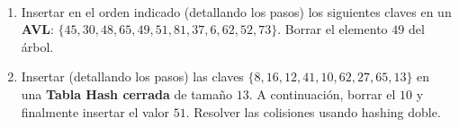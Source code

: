 \documentclass[12pt]{article}
\begin{document}
    \begin{ejercicio}[1 punto]\ 
        \begin{enumerate}[label=(\alph*)]
            \item Insertar en el orden indicado (detallando los pasos) los siguientes claves en un \textbf{AVL}: $\{45,30,48,65,49,51,81,37,6,62,52,73\}$. Borrar el elemento $49$ del árbol.
            \item Insertar (detallando los pasos) las claves $\{8,16,12,41,10,62,27,65,13\}$ en una \textbf{Tabla Hash cerrada} de tamaño $13$. A continuación, borrar el $10$ y finalmente insertar el valor $51$. Resolver las colisiones usando hashing doble.
        \end{enumerate}
    \end{ejercicio}
\end{document}
